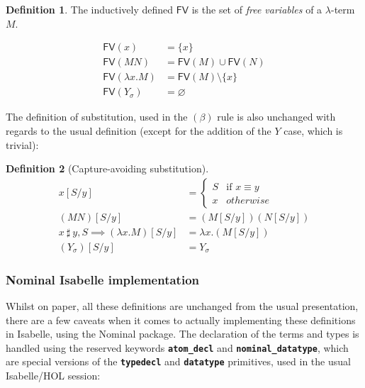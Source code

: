 \documentclass[a4paper, 12pt, twoside]{style/ociamthesis}
\theoremstyle{plain}
\theoremstyle{definition}
\newtheorem{Definition}{Definition}[chapter]
\theoremstyle{remark}
\newcommand{\fv}{\textsf{FV}}
\let\emptyset\varnothing
\begin{document}
\begin{Definition}

The inductively defined \(\fv\) is the set of \emph{free variables} of a
\(\lambda\)-term \(M\).

\begin{align*} 
\fv(x) &= \{ x \}\\
\fv(MN) &= \fv(M) \cup \fv(N)\\
\fv(\lambda x. M) &= \fv(M) \setminus \{ x \}\\
\fv(Y_\sigma) &= \emptyset
\end{align*}

\end{Definition}

The definition of substitution, used in the \((\beta)\) rule is also
unchanged with regards to the usual definition (except for the addition
of the \(Y\) case, which is trivial):

\begin{Definition}[Capture-avoiding substitution]

\begin{align*} 
x[S/y] &= \begin{cases}
S & \text{if }x \equiv y\\
x & otherwise
\end{cases}\\
(MN)[S/y] &= (M[S/y])(N[S/y])\\
x\ \sharp\ y , S \implies (\lambda x.M)[S/y] &= \lambda x.(M[S/y])\\
(Y_\sigma)[S/y] &= Y_\sigma
\end{align*}

\end{Definition}

\subsubsection{Nominal Isabelle
implementation}\label{nominal-isabelle-implementation}

Whilst on paper, all these definitions are unchanged from the usual
presentation, there are a few caveats when it comes to actually
implementing these definitions in Isabelle, using the Nominal package.
The declaration of the terms and types is handled using the reserved
keywords \textbf{\texttt{atom\_decl}} and
\textbf{\texttt{nominal\_datatype}}, which are special versions of the
\textbf{\texttt{typedecl}} and \textbf{\texttt{datatype}} primitives,
used in the usual Isabelle/HOL session:
\end{document}
